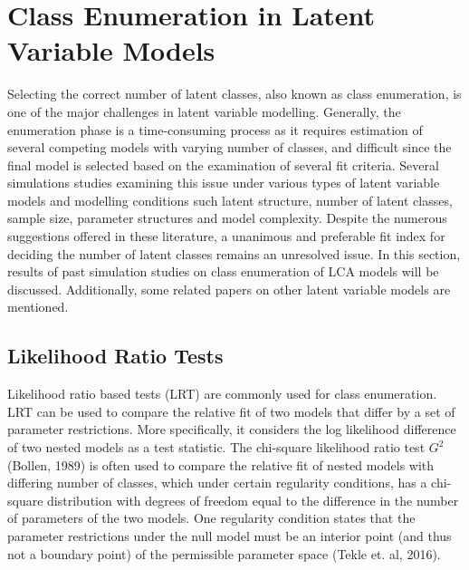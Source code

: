 \hspace{1em}

\section{Class Enumeration in Latent Variable Models}

Selecting the correct number of latent classes, also known as class enumeration, is one of the major challenges in latent variable modelling. Generally, the enumeration phase is a time-consuming process as it requires estimation of several competing models with varying number of classes, and difficult since the final model is selected based on the examination of several fit criteria. Several simulations studies examining this issue under various types of latent variable models and modelling conditions such latent structure, number of latent classes, sample size, parameter structures and model complexity. Despite the numerous suggestions offered in these literature, a unanimous and preferable fit index for deciding the number of latent classes remains an unresolved issue. In this section, results of past simulation studies on class enumeration of LCA models will be discussed. Additionally, some related papers on other latent variable models are mentioned. 

\subsection{Likelihood Ratio Tests}

\hspace{1em} Likelihood ratio based tests (LRT) are commonly used for class enumeration. LRT can be used to compare the relative fit of two models that differ by a set of parameter restrictions. More specifically, it considers the log likelihood difference of two nested models as a test statistic. The chi-square likelihood ratio test $G^{2}$ (Bollen, 1989) is often used to compare the relative fit of nested models with differing number of classes, which under certain regularity conditions, has a chi-square distribution with degrees of freedom equal to the difference in the number of parameters of the two models. One regularity condition states that the parameter restrictions under the null model must be an interior point (and thus not a boundary point) of the permissible parameter space (Tekle et. al, 2016). 

